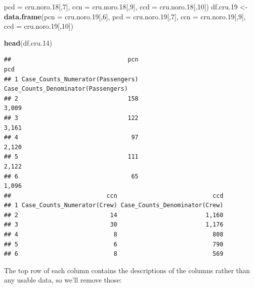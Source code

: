 \documentclass[
  11,
]{book}
\newenvironment{Shaded}{\begin{snugshade}}{\end{snugshade}}
\newcommand{\AttributeTok}[1]{\textcolor[rgb]{0.27,0.27,0.27}{#1}}
\newcommand{\DecValTok}[1]{\textcolor[rgb]{0.06,0.06,0.06}{#1}}
\newcommand{\FloatTok}[1]{\textcolor[rgb]{0.06,0.06,0.06}{#1}}
\newcommand{\FunctionTok}[1]{\textcolor[rgb]{0.27,0.27,0.27}{\textbf{#1}}}
\newcommand{\NormalTok}[1]{#1}
\newcommand{\OtherTok}[1]{\textcolor[rgb]{0.37,0.37,0.37}{#1}}
\begin{document}
\begin{Shaded}
\begin{Highlighting}[]
                        \AttributeTok{pcd =}\NormalTok{ cru.noro}\FloatTok{.18}\NormalTok{[,}\DecValTok{7}\NormalTok{],}
                        \AttributeTok{ccn =}\NormalTok{ cru.noro}\FloatTok{.18}\NormalTok{[,}\DecValTok{9}\NormalTok{],}
                        \AttributeTok{ccd =}\NormalTok{ cru.noro}\FloatTok{.18}\NormalTok{[,}\DecValTok{10}\NormalTok{])}
\NormalTok{df.cru}\FloatTok{.19} \OtherTok{\textless{}{-}} \FunctionTok{data.frame}\NormalTok{(}\AttributeTok{pcn =}\NormalTok{ cru.noro}\FloatTok{.19}\NormalTok{[,}\DecValTok{6}\NormalTok{],}
                        \AttributeTok{pcd =}\NormalTok{ cru.noro}\FloatTok{.19}\NormalTok{[,}\DecValTok{7}\NormalTok{],}
                        \AttributeTok{ccn =}\NormalTok{ cru.noro}\FloatTok{.19}\NormalTok{[,}\DecValTok{9}\NormalTok{],}
                        \AttributeTok{ccd =}\NormalTok{ cru.noro}\FloatTok{.19}\NormalTok{[,}\DecValTok{10}\NormalTok{])}

\FunctionTok{head}\NormalTok{(df.cru}\FloatTok{.14}\NormalTok{)}
\end{Highlighting}
\end{Shaded}

\begin{verbatim}
##                                 pcn                                 pcd
## 1 Case_Counts_Numerator(Passengers) Case_Counts_Denominator(Passengers)
## 2                               158                               3,009
## 3                               122                               3,161
## 4                                97                               2,120
## 5                               111                               2,122
## 6                                65                               1,096
##                           ccn                           ccd
## 1 Case_Counts_Numerator(Crew) Case_Counts_Denominator(Crew)
## 2                          14                         1,160
## 3                          30                         1,176
## 4                           8                           808
## 5                           6                           790
## 6                           8                           569
\end{verbatim}

The top row of each column contains the descriptions of the columns rather than any usable data, so we'll remove those:
\end{document}
